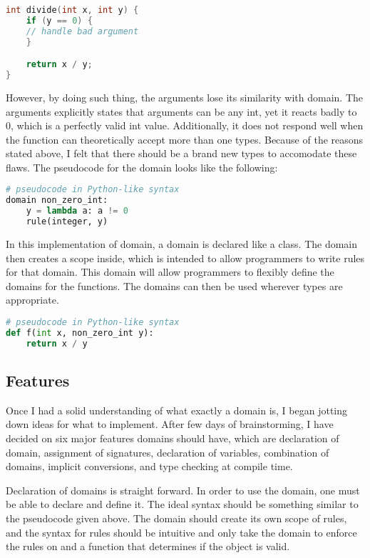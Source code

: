 \begin{lstlisting}[language=C++, caption={Domain example}]
int divide(int x, int y) {
    if (y == 0) {
	// handle bad argument
    }

    return x / y;
}
\end{lstlisting}

However, by doing such thing, the arguments lose its similarity with domain.  The arguments explicitly states that arguments can be any int, yet it reacts badly to 0, which is a perfectly valid int value.  Additionally, it does not respond well when the function can theoretically accept more than one types.  Because of the reasons stated above, I felt that there should be a brand new types to accomodate these flaws.  The pseudocode for the domain looks like the following:

\begin{lstlisting}[language=Python, caption={Domain pseudocode}]
# pseudocode in Python-like syntax
domain non_zero_int: 
    y = lambda a: a != 0
    rule(integer, y)
\end{lstlisting}

In this implementation of domain, a domain is declared like a class.  The domain then creates a scope inside, which is intended to allow programmers to write rules for that domain.  This domain will allow programmers to flexibly define the domains for the functions.  The domains can then be used wherever types are appropriate.

\begin{lstlisting}[language=Python, caption={Domain pseudocode}]
# pseudocode in Python-like syntax
def f(int x, non_zero_int y):
    return x / y
\end{lstlisting}

\subsection{Features}

Once I had a solid understanding of what exactly a domain is, I began jotting down ideas for what to implement.  After few days of brainstorming, I have decided on six major features domains should have, which are declaration of domain, assignment of signatures, declaration of variables, combination of domains, implicit conversions, and type checking at compile time.

Declaration of domains is straight forward.  In order to use the domain, one must be able to declare and define it.  The ideal syntax should be something similar to the pseudocode given above.  The domain should create its own scope of rules, and the syntax for rules should be intuitive and only take the domain to enforce the rules on and a function that determines if the object is valid.

